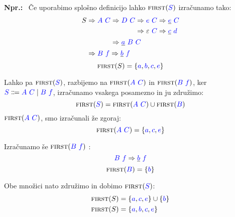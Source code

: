 \documentclass{article}
\newcommand{\Ex}{\textbf{Npr.:}\ }
\newcommand{\FIRST}{\textsc{first}}
\newcommand{\Symbol}[1]{\textcolor{blue}{#1}}
\newcommand{\Null}{\varepsilon}
\newcommand{\Arrow}{\Coloneq}
\newcommand{\Derive}{\Rightarrow}
\newcommand{\Seq}{\ }
\newcommand{\Union}{\mathrel{|}}
\begin{document}
\Ex
Če uporabimo splošno definicijo lahko $\FIRST(\Symbol{S})$ izračunamo tako:
\begin{equation*}
  S \begin{aligned}[t]
    &\Derive \Symbol{A} \Seq \Symbol{C} \begin{aligned}[t]
      &\Derive \Symbol{D} \Seq \Symbol{C} \begin{aligned}[t]
        &\Derive \Symbol{e} \Seq \Symbol{C} \Derive \underline{\Symbol{e}} \Seq \Symbol{C} \\
        &\Derive \Null \Seq \Symbol{C} \Derive \underline{\Symbol{c}} \Seq \Symbol{d} \\
      \end{aligned}\\
      &\Derive \underline{\Symbol{a}} \Seq \Symbol{B} \Seq \Symbol{C}
    \end{aligned}\\
    &\Derive \Symbol{B} \Seq \Symbol{f} \Derive \underline{\Symbol{b}} \Seq \Symbol{f}
  \end{aligned}
\end{equation*}
\begin{equation*}
  \FIRST(S) = \{\Symbol{a}, \Symbol{b}, \Symbol{c}, \Symbol{e}\}
\end{equation*}

Lahko pa $\FIRST(\Symbol{S})$, razbijemo na $\FIRST(\Symbol{A} \Seq \Symbol{C})$ in $\FIRST(\Symbol{B} \Seq \Symbol{f})$, ker $\Symbol{S} \Arrow \Symbol{A} \Seq \Symbol{C} \Union \Symbol{B} \Seq \Symbol{f}$, izračunamo vsakega posamezno in ju združimo:
\begin{equation*}
  \FIRST(\Symbol{S}) = \FIRST(\Symbol{A} \Seq \Symbol{C}) \cup \FIRST(\Symbol{B})
\end{equation*}
$\FIRST(\Symbol{A} \Seq \Symbol{C})$, smo izračunali že zgoraj:
\begin{equation*}
  \FIRST(\Symbol{A} \Seq \Symbol{C}) = \{\Symbol{a}, \Symbol{c}, \Symbol{e}\}
\end{equation*}

Izračunamo še $\FIRST(\Symbol{B} \Seq \Symbol{f})$ :
\begin{equation*}
  \Symbol{B} \Seq \Symbol{f} \Derive \underline{\Symbol{b}} \Seq \Symbol{f}
\end{equation*}
\begin{equation*}
  \FIRST(\Symbol{B}) = \{\Symbol{b}\}
\end{equation*}

Obe množici nato združimo in dobimo $\FIRST(\Symbol{S})$:
\begin{align*}
  \FIRST(S) &= \{\Symbol{a}, \Symbol{c}, \Symbol{e}\} \cup \{\Symbol{b}\}\\
  \FIRST(S) &= \{\Symbol{a}, \Symbol{b}, \Symbol{c}, \Symbol{e}\}
\end{align*}
\end{document}
